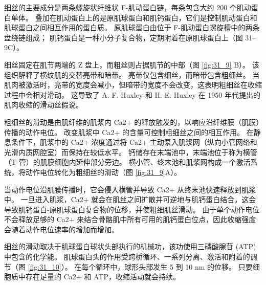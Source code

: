 细丝的主要成分是两条螺旋状纤维状 F-肌动蛋白链，每条包含大约 200 个肌动蛋白单体。 叠加在肌动蛋白上的是原肌球蛋白和肌钙蛋白，它们是控制肌动蛋白和肌球蛋白之间相互作用的蛋白质。 原肌球蛋白由位于 F-肌动蛋白螺旋槽中的两条盘绕链组成； 肌钙蛋白是一种小分子复合物，定期附着在原肌球蛋白上（图 31–9C）。

细丝固定在肌节两端的 Z 盘上，而粗丝则占据肌节的中部（图 \ref{fig:31_9} B）。 该组织解释了横纹肌的交替亮带和暗带。 亮带仅包含细丝，而暗带包含粗细丝。 当肌肉被激活时，亮带的宽度会减小，但暗带的宽度不会改变，这表明粗细丝在收缩过程中会相对滑动。 这导致了 A. F. Huxley 和 H. E. Huxley 在 1950 年代提出的肌肉收缩的滑动丝假说。

粗细丝的滑动是由肌纤维的肌浆内 Ca2+ 的释放触发的，以响应沿纤维膜（肌膜）传播的动作电位。 改变肌浆中 Ca2+ 的含量可控制粗细丝之间的相互作用。 在静息条件下，肌浆中的 Ca2+ 浓度通过将 Ca2+ 主动泵入肌浆网（纵向小管网络和光滑内质网腔室）而保持在较低水平。 钙储存在末端池中，末端池位于称为横管（T 管）的肌膜细胞内延伸部分旁边。 横小管、终末池和肌浆网构成一个激活系统，将动作电位转化为粗细丝的滑动（图 \ref{fig:31_9}A）。

当动作电位沿肌膜传播时，它会侵入横管并导致 Ca2+ 从终末池快速释放到肌浆中。 一旦进入肌浆，Ca2+ 就会在肌丝之间扩散并可逆地与肌钙蛋白结合，这会导致肌钙蛋白-原肌球蛋白复合物的位移，并使粗细肌丝滑动。 由于单个动作电位不会释放足够的 Ca2+ 来结合骨骼肌中所有可用的肌钙蛋白位点，因此收缩强度会随着动作电位速率的增加而增加。

细丝的滑动取决于肌球蛋白球状头部执行的机械功，该功使用三磷酸腺苷 (ATP) 中包含的化学能。 
肌球蛋白头的作用受跨桥循环、一系列分离、激活和附着的调节（图 \ref{fig:31_10}）。 
在每个循环中，球形头部发生 5 到 10 nm 的位移。 只要细胞质中存在足量的 Ca2+ 和 ATP，收缩活动就会持续。

